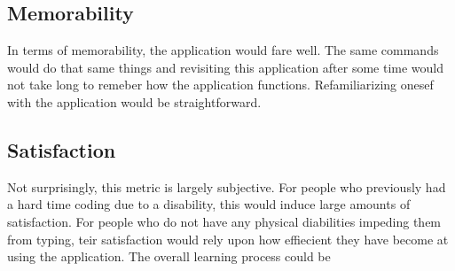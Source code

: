 \documentclass[11pt, oneside]{article}
\begin{document}
\subsection{Memorability}
In terms of memorability, the application would fare well. The same commands would do that same things and revisiting this application after some time would not take long to remeber how the application functions. Refamiliarizing onesef with the application would be straightforward.

\subsection{Satisfaction}
Not surprisingly, this metric is largely subjective. For people who previously had a hard time coding due to a disability, this would induce large amounts of satisfaction. For people who do not have any physical diabilities impeding them from typing, teir satisfaction would rely upon how effiecient they have become at using the application. The overall learning process could be
\end{document}
